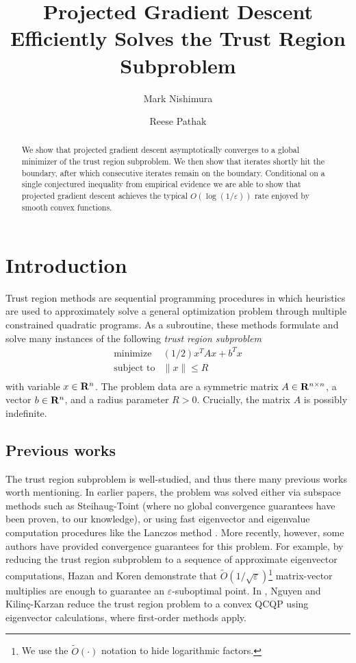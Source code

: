 \documentclass[11pt]{article}
\title{Projected Gradient Descent Efficiently Solves the Trust Region Subproblem}
\author{Mark Nishimura \and Reese Pathak}
\let\epsilon\varepsilon
\begin{document}
\maketitle

\begin{abstract}
We show that projected gradient descent asymptotically converges to a global minimizer of 
the trust region subproblem. We then show that iterates shortly hit the boundary, after which
consecutive iterates remain on the boundary. Conditional on a single conjectured inequality
from empirical evidence we are able to show that projected gradient descent achieves
the typical $O(\log(1/\epsilon))$ rate enjoyed by smooth convex functions. 
\end{abstract}


\section{Introduction}
Trust region methods are sequential programming procedures in which heuristics are used to approximately solve a general optimization problem through multiple constrained quadratic programs. As a subroutine, these methods formulate and solve many instances of the following \emph{trust region subproblem}
\begin{equation}\label{problem:TR}
\begin{array}{ll} 
\mbox{minimize} & (1/2)x^TAx + b^T x \\
\mbox{subject to} & 
\|x\| \leq R\\
\end{array}
\end{equation}
with variable $x \in \mathbf{R}^n$. 
The problem data are a symmetric matrix $A \in \mathbf{R}^{n \times n}$, a vector $b \in \mathbf{R}^n$, and a radius parameter $R > 0$. Crucially, the matrix $A$ is possibly indefinite. 
\subsection{Previous works}
The trust region subproblem is well-studied, and thus there many previous works worth mentioning. In earlier papers, the problem was solved either via subspace methods such as Steihaug-Toint (where no global convergence guarantees have been proven, to our knowledge), or using fast eigenvector and eigenvalue computation procedures like the Lanczos method \cite{conn2000, erway2009, gould1999, gould2010}. More recently, however, some authors have provided convergence guarantees for this problem. For example, by reducing the trust region subproblem to a sequence of approximate eigenvector computations, Hazan and Koren \cite{hazan2016}
demonstrate that $\tilde O(1/\sqrt{\epsilon})$\footnote{We use the $\tilde O(\cdot)$ notation to hide logarithmic factors.} matrix-vector multiplies are enough to guarantee an 
$\epsilon$-suboptimal point. In \cite{nguyen2017}, Nguyen and Kilin{\c{c}}{-}Karzan reduce the trust region problem to a convex QCQP using eigenvector calculations, where first-order methods apply. 
\end{document}
